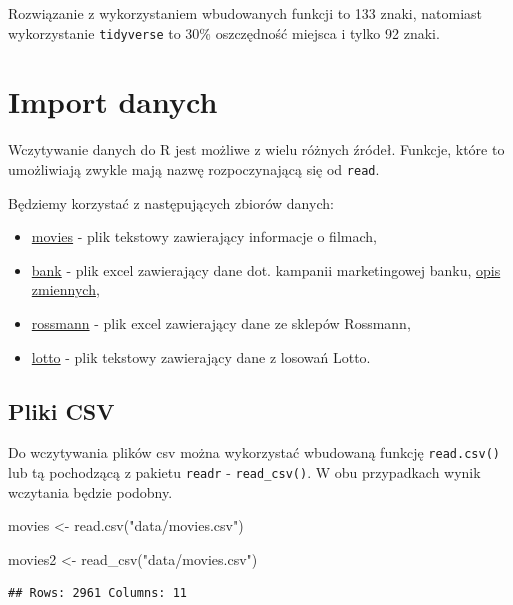 \documentclass[
]{book}
\newenvironment{Shaded}{\begin{snugshade}}{\end{snugshade}}
\newcommand{\FunctionTok}[1]{\textcolor[rgb]{0.00,0.00,0.00}{#1}}
\newcommand{\NormalTok}[1]{#1}
\newcommand{\OtherTok}[1]{\textcolor[rgb]{0.56,0.35,0.01}{#1}}
\newcommand{\StringTok}[1]{\textcolor[rgb]{0.31,0.60,0.02}{#1}}
\providecommand{\tightlist}{%
  \setlength{\itemsep}{0pt}\setlength{\parskip}{0pt}}
\begin{document}
Rozwiązanie z wykorzystaniem wbudowanych funkcji to 133 znaki, natomiast wykorzystanie \texttt{tidyverse} to 30\% oszczędność miejsca i tylko 92 znaki.

\hypertarget{import-danych}{%
\section{Import danych}\label{import-danych}}

Wczytywanie danych do R jest możliwe z wielu różnych źródeł. Funkcje, które to umożliwiają zwykle mają nazwę rozpoczynającą się od \texttt{read}.

Będziemy korzystać z następujących zbiorów danych:

\begin{itemize}
\tightlist
\item
  \href{data/movies.csv}{movies} - plik tekstowy zawierający informacje o filmach,
\item
  \href{data/bank.xlsx}{bank} - plik excel zawierający dane dot. kampanii marketingowej banku, \href{data/bank_opis.pdf}{opis zmiennych},
\item
  \href{data/rossmann.xlsx}{rossmann} - plik excel zawierający dane ze sklepów Rossmann,
\item
  \href{http://www.mbnet.com.pl/dl.txt}{lotto} - plik tekstowy zawierający dane z losowań Lotto.
\end{itemize}

\hypertarget{pliki-csv}{%
\subsection{Pliki CSV}\label{pliki-csv}}

Do wczytywania plików csv można wykorzystać wbudowaną funkcję \texttt{read.csv()} lub tą pochodzącą z pakietu \texttt{readr} - \texttt{read\_csv()}. W obu przypadkach wynik wczytania będzie podobny.

\begin{Shaded}
\begin{Highlighting}[]
\NormalTok{movies }\OtherTok{\textless{}{-}} \FunctionTok{read.csv}\NormalTok{(}\StringTok{"data/movies.csv"}\NormalTok{)}

\NormalTok{movies2 }\OtherTok{\textless{}{-}} \FunctionTok{read\_csv}\NormalTok{(}\StringTok{"data/movies.csv"}\NormalTok{)}
\end{Highlighting}
\end{Shaded}

\begin{verbatim}
## Rows: 2961 Columns: 11
\end{verbatim}
\end{document}
